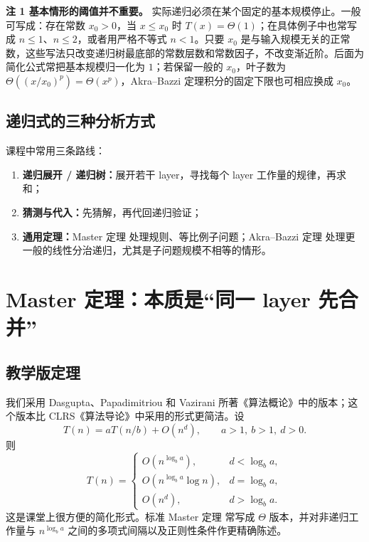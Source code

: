 \documentclass[11pt,a4paper]{article}
\newcommand{\AB}{Akra--Bazzi 定理}
\newcommand{\Master}{Master 定理}
\begin{document}
\medskip
\noindent\textbf{注 1 基本情形的阈值并不重要。}
实际递归必须在某个固定的基本规模停止。一般可写成：存在常数 $x_0>0$，当 $x\le x_0$ 时 $T(x)=\Theta(1)$；在具体例子中也常写成 $n\le 1$、$n\le 2$，或者用严格不等式 $n<1$。只要 $x_0$ 是与输入规模无关的正常数，这些写法只改变递归树最底部的常数层数和常数因子，不改变渐近阶。后面为简化公式常把基本规模归一化为 $1$；若保留一般的 $x_0$，叶子数为 $\Theta((x/x_0)^p)=\Theta(x^p)$，Akra--Bazzi 定理积分的固定下限也可相应换成 $x_0$。
\medskip

\subsection{递归式的三种分析方式}
课程中常用三条路线：
\begin{enumerate}[label=(\arabic*)]
  \item \textbf{递归展开 / 递归树：}展开若干 layer，寻找每个 layer 工作量的规律，再求和；
  \item \textbf{猜测与代入：}先猜解，再代回递归验证；
  \item \textbf{通用定理：}\Master{} 处理规则、等比例子问题；\AB{} 处理更一般的线性分治递归，尤其是子问题规模不相等的情形。
\end{enumerate}

\section{Master 定理：本质是“同一 layer 先合并”}

\subsection{教学版定理}
我们采用 Dasgupta、Papadimitriou 和 Vazirani 所著《算法概论》\cite{DPV}中的版本；这个版本比 CLRS《算法导论》中采用的形式更简洁。设
\begin{equation}
T(n)=aT(n/b)+O(n^d),\qquad a>1,\ b>1,\ d>0.
\end{equation}
则
\begin{equation}
T(n)=
\begin{cases}
O(n^{\log_b a}), & d<\log_b a,\\
O(n^{\log_b a}\log n), & d=\log_b a,\\
O(n^d), & d>\log_b a.
\end{cases}
\end{equation}
这是课堂上很方便的简化形式。标准 \Master{} 常写成 $\Theta$ 版本，并对非递归工作量与 $n^{\log_b a}$ 之间的多项式间隔以及正则性条件作更精确陈述。
\end{document}
